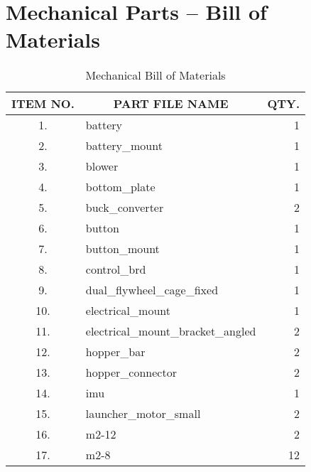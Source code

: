 \chapter{Mechanical Parts -- Bill of Materials}
\label{appendix:mech_bom}

\begin{longtable}{clr}
	\caption{Mechanical Bill of Materials}
	\label{tab:mech_bom}
	\endfirsthead
	\endhead
	\toprule
			ITEM NO. & \multicolumn{1}{c}{PART FILE NAME}      & \multicolumn{1}{c}{QTY.} \\ 
	\midrule
	1.        & battery                                 & 1                        \\ 
	2.        & battery\_mount                          & 1                        \\ 
	3.        & blower                                  & 1                        \\ 
	4.        & bottom\_plate                           & 1                        \\ 
	5.        & buck\_converter                         & 2                        \\ 
	6.        & button                                  & 1                        \\ 
	7.        & button\_mount                           & 1                        \\ 
	8.        & control\_brd                            & 1                        \\ 
	9.        & dual\_flywheel\_cage\_fixed             & 1                        \\ 
	10.       & electrical\_mount                       & 1                        \\ 
	11.       & electrical\_mount\_bracket\_angled      & 2                        \\ 
	12.       & hopper\_bar                             & 2                        \\ 
	13.       & hopper\_connector                       & 2                        \\ 
	14.       & imu                                     & 1                        \\ 
	15.       & launcher\_motor\_small                  & 2                        \\ 
	16.       & m2-12                                   & 2                        \\ 
	17.       & m2-8                                    & 12                       \\ 

\end{longtable}
